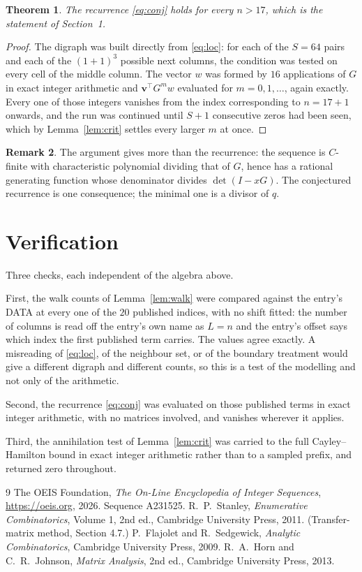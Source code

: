 \documentclass[11pt,a4paper]{article}
\theoremstyle{plain}
\newtheorem{theorem}{Theorem}
\theoremstyle{definition}
\newtheorem{remark}[theorem]{Remark}
\begin{document}
\begin{theorem}
The recurrence \eqref{eq:conj} holds for every $n>17$, which is the statement of
Section~1.
\end{theorem}

\begin{proof}
The digraph was built directly from \eqref{eq:loc}: for each of the $S=64$ pairs and each
of the $(1+1)^{3}$ possible next columns, the condition was tested on every cell of
the middle column. The vector $w$ was formed by $16$ applications of $G$ in exact integer
arithmetic and $\mathbf{v}^{\!\top}G^{m}w$ evaluated for $m=0,1,\dots$, again exactly.
Every one of those integers vanishes from the index corresponding to $n=17+1$ onwards,
and the run was continued until $S+1$ consecutive zeros had been seen, which by
Lemma~\ref{lem:crit} settles every larger $m$ at once.
\end{proof}

\begin{remark}
The argument gives more than the recurrence: the sequence is $C$-finite with characteristic
polynomial dividing that of $G$, hence has a rational generating function whose denominator
divides $\det(I-xG)$. The conjectured recurrence is one consequence; the minimal one is a
divisor of $q$.
\end{remark}

\section{Verification}

Three checks, each independent of the algebra above.

First, the walk counts of Lemma~\ref{lem:walk} were compared against the entry's DATA at
every one of the $20$ published indices, with no shift fitted: the number of columns is
read off the entry's own name as $L=n$ and the entry's offset says which index the first
published term carries. The values agree exactly. A misreading of \eqref{eq:loc}, of the
neighbour set, or of the boundary treatment would give a different digraph and different
counts, so this is a test of the modelling and not only of the arithmetic.

Second, the recurrence \eqref{eq:conj} was evaluated on those published terms in exact
integer arithmetic, with no matrices involved, and vanishes wherever it applies.

Third, the annihilation test of Lemma~\ref{lem:crit} was carried to the full
Cayley--Hamilton bound in exact integer arithmetic rather than to a sampled prefix, and
returned zero throughout.

\begin{thebibliography}{9}
 The OEIS Foundation, \emph{The On-Line Encyclopedia of Integer
Sequences}, \url{https://oeis.org}, 2026. Sequence A231525.
 R.~P.~Stanley, \emph{Enumerative Combinatorics}, Volume 1, 2nd ed.,
Cambridge University Press, 2011. (Transfer-matrix method, Section 4.7.)
 P.~Flajolet and R.~Sedgewick, \emph{Analytic Combinatorics}, Cambridge
University Press, 2009.
 R.~A.~Horn and C.~R.~Johnson, \emph{Matrix Analysis}, 2nd ed., Cambridge
University Press, 2013.
\end{thebibliography}
\end{document}
